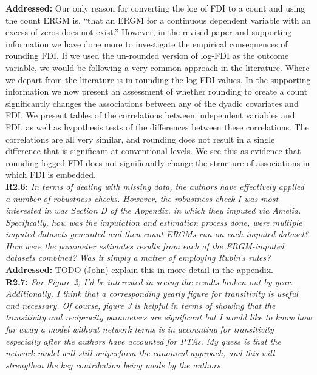 \documentclass[a4paper,11pt]{texMemo}
\begin{document}
\noindent \textbf{Addressed:} Our only reason for converting the log of FDI to a count and using the count ERGM is, ``that an ERGM for a continuous dependent variable with an excess of zeros does not exist.'' However, in the revised paper and supporting information we have done more to investigate the empirical consequences of rounding FDI. If we used the un-rounded version of log-FDI as the outcome variable, we would be following a very common approach in the literature. Where we depart from the literature is in rounding the log-FDI values. In the supporting information we now present an assessment of whether rounding to create a count significantly changes the associations between any of the dyadic covariates and FDI. We present tables of the correlations between independent variables and FDI, as well as hypothesis tests of the differences between these correlations. The correlations are all very similar, and rounding does not result in a single difference that is significant at conventional levels. We see this as evidence that rounding logged FDI does not significantly change the structure of associations in which FDI is embedded. \\

\noindent \textbf{R2.6:} \emph{In terms of dealing with missing data, the authors have effectively applied a number of robustness checks. However, the robustness check I was most interested in was Section D of the Appendix, in which they imputed via Amelia. Specifically, how was the imputation and estimation process done, were multiple imputed datasets generated and then count ERGMs run on each imputed dataset? How were the parameter estimates results from each of the ERGM-imputed datasets combined? Was it simply a matter of employing Rubin's rules?}\\

\noindent \textbf{Addressed:} TODO (John) explain this in more detail in the appendix. \\

\noindent \textbf{R2.7:} \emph{For Figure 2, I'd be interested in seeing the results broken out by year. Additionally, I think that a corresponding yearly figure for transitivity is useful and necessary. Of course, figure 3 is helpful in terms of showing that the transitivity and reciprocity parameters are significant but I would like to know how far away a model without network terms is in accounting for transitivity especially after the authors have accounted for PTAs. My guess is that the network model will still outperform the canonical approach, and this will strengthen the key contribution being made by the authors.}\\
\end{document}

